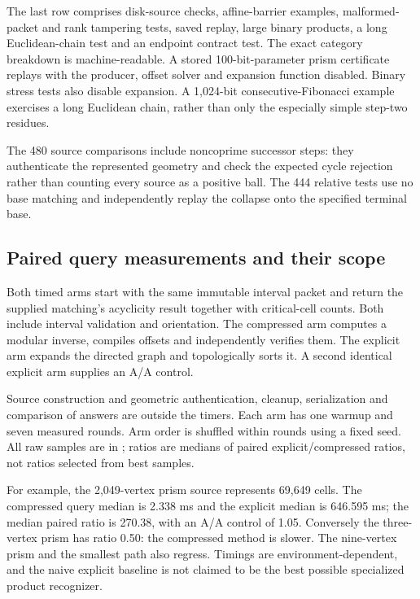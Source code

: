 \documentclass[11pt,letterpaper]{article}
\theoremstyle{definition}
\theoremstyle{remark}\newtheorem{remark}[theorem]{Remark}
\newcommand{\code}[1]{\texttt{\detokenize{#1}}}
\begin{document}
The last row comprises disk-source checks, affine-barrier examples, malformed-packet and rank tampering tests, saved replay, large binary products, a long Euclidean-chain test and an endpoint contract test. The exact category breakdown is machine-readable. A stored 100-bit-parameter prism certificate replays with the producer, offset solver and expansion function disabled. Binary stress tests also disable expansion. A 1,024-bit consecutive-Fibonacci example exercises a long Euclidean chain, rather than only the especially simple step-two residues.

The 480 source comparisons include noncoprime successor steps: they authenticate the represented geometry and check the expected cycle rejection rather than counting every source as a positive ball. The 444 relative tests use no base matching and independently replay the collapse onto the specified terminal base.

\subsection{Paired query measurements and their scope}

Both timed arms start with the same immutable interval packet and return the supplied matching's acyclicity result together with critical-cell counts. Both include interval validation and orientation. The compressed arm computes a modular inverse, compiles offsets and independently verifies them. The explicit arm expands the directed graph and topologically sorts it. A second identical explicit arm supplies an A/A control.

Source construction and geometric authentication, cleanup, serialization and comparison of answers are outside the timers. Each arm has one warmup and seven measured rounds. Arm order is shuffled within rounds using a fixed seed. All raw samples are in \code{results/benchmark.json}; ratios are medians of paired explicit/compressed ratios, not ratios selected from best samples.

\begin{center}\small

\end{center}

For example, the 2,049-vertex prism source represents 69,649 cells. The compressed query median is 2.338 ms and the explicit median is 646.595 ms; the median paired ratio is 270.38, with an A/A control of 1.05. Conversely the three-vertex prism has ratio 0.50: the compressed method is slower. The nine-vertex prism and the smallest path also regress. Timings are environment-dependent, and the naive explicit baseline is not claimed to be the best possible specialized product recognizer.
\end{document}
